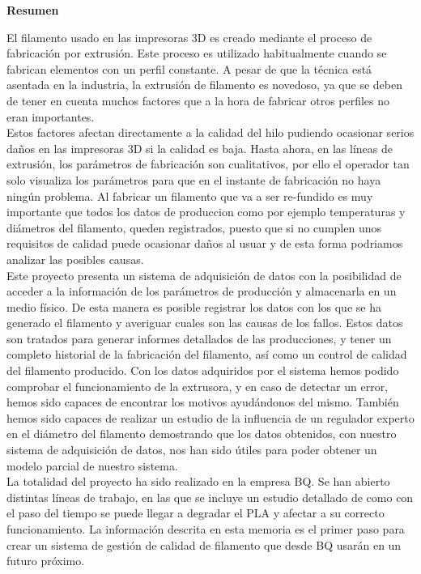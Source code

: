 
\thispagestyle{empty}
\begin{center}
    \Large
    \vspace{0.9cm}
    \textbf{Resumen}
\end{center}

El filamento usado en las impresoras 3D es creado mediante el proceso de fabricación por extrusión. Este proceso es utilizado habitualmente cuando se fabrican elementos con un perfil constante. A pesar de que la técnica está asentada en la industria, la extrusión de filamento es novedoso, ya que se deben de tener en cuenta muchos factores que a la hora de fabricar otros perfiles no eran importantes.\\

Estos factores afectan directamente a la calidad del hilo pudiendo ocasionar serios daños en las impresoras 3D si la calidad es baja. Hasta ahora, en las líneas de extrusión, los parámetros de fabricación son cualitativos, por ello el operador tan solo visualiza los parámetros para que en el instante de fabricación no haya ningún problema. Al fabricar un filamento que va a ser re-fundido es muy importante que todos los datos de produccion como por ejemplo temperaturas y diámetros del filamento, queden registrados, puesto que si no cumplen unos requisitos de calidad puede ocasionar daños al usuar y de esta forma podriamos analizar las posibles causas.\\

Este proyecto presenta un sistema de adquisición de datos con la posibilidad de acceder a la información de los parámetros de producción y almacenarla en un medio físico. De esta manera es posible registrar los datos con los que se ha generado el filamento y averiguar cuales son las causas de los fallos. Estos datos son tratados para generar informes detallados de las producciones, y tener un completo historial de la fabricación del filamento, así como un control de calidad del filamento producido. Con los datos adquiridos por el sistema hemos podido comprobar el funcionamiento de la extrusora, y en caso de detectar un error, hemos sido capaces de encontrar los motivos ayudándonos del mismo. También hemos sido capaces de realizar un estudio de la influencia de un regulador experto en el diámetro del filamento demostrando que los datos obtenidos, con nuestro sistema de adquisición de datos, nos han sido útiles para poder obtener un modelo parcial de nuestro sistema.\\

La totalidad del proyecto ha sido realizado en la empresa BQ. Se han abierto distintas líneas de trabajo, en las que se incluye un estudio detallado de como con el paso del tiempo se puede llegar a degradar el PLA y afectar a su correcto funcionamiento. La información descrita en esta memoria es el primer paso para crear un sistema de gestión de calidad de filamento que desde BQ usarán en un futuro próximo. \\

